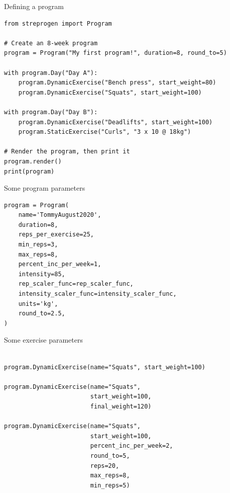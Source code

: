 \documentclass[11pt, aspectratio=149]{beamer}
\theoremstyle{plain}
\begin{document}
\begin{frame}[fragile, t]{Defining a program}
\begin{verbatim}
from streprogen import Program

# Create an 8-week program
program = Program("My first program!", duration=8, round_to=5)

with program.Day("Day A"):
    program.DynamicExercise("Bench press", start_weight=80)
    program.DynamicExercise("Squats", start_weight=100)

with program.Day("Day B"):
    program.DynamicExercise("Deadlifts", start_weight=100)
    program.StaticExercise("Curls", "3 x 10 @ 18kg")

# Render the program, then print it
program.render()
print(program)
\end{verbatim}
\end{frame}

\begin{frame}[fragile, t]{Some program parameters}
\begin{verbatim}
program = Program(
    name='TommyAugust2020',
    duration=8,
    reps_per_exercise=25, 
    min_reps=3, 
    max_reps=8,
    percent_inc_per_week=1,
    intensity=85,
    rep_scaler_func=rep_scaler_func,
    intensity_scaler_func=intensity_scaler_func,
    units='kg',
    round_to=2.5,
)
\end{verbatim}
\end{frame}

\begin{frame}[fragile, t]{Some exercise parameters}
	\begin{verbatim}

program.DynamicExercise(name="Squats", start_weight=100)
    
program.DynamicExercise(name="Squats", 
                        start_weight=100, 
                        final_weight=120)
                                             
program.DynamicExercise(name="Squats", 
                        start_weight=100, 
                        percent_inc_per_week=2,
                        round_to=5,
                        reps=20,
                        max_reps=8, 
                        min_reps=5)
	\end{verbatim}
\end{frame}
\end{document}
